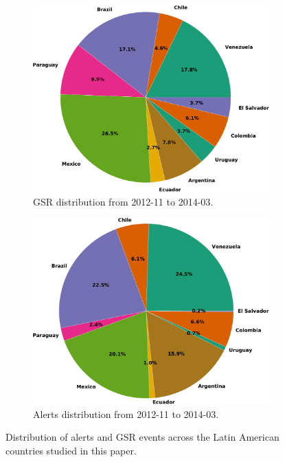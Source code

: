 \documentclass[letterpaper]{article}
\begin{document}
\begin{figure}
\begin{subfigure}{0.4\columnwidth}
  \raggedleft
  \includegraphics[height=.2\textheight]{gsr_distribution} 
  \caption{\scriptsize GSR distribution from 2012-11 to 2014-03.}
  \label{fig:gsrdistribution}
\end{subfigure}\hspace{3.2em}%
\begin{subfigure}{.4\columnwidth}
  \raggedright
  \includegraphics[height=.2\textheight]{pp_dist}
  \caption{\scriptsize Alerts distribution from 2012-11 to 2014-03.}
  \label{fig:ppdistribution}
\end{subfigure}
\caption{Distribution of alerts and GSR events across the Latin American countries studied in this paper.}
\label{fig:distribution}
\end{figure}
\end{document}
